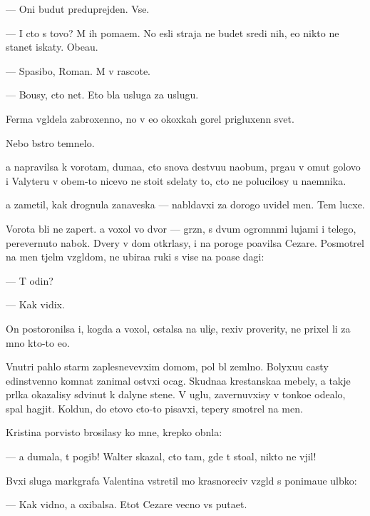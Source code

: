 \documentclass[10pt]{book}
\begin{document}
— Oni budut preduprejden{\yi}. Vse.

— I cto s tovo? M{\yi} ih po{\y}ma{\y}em. No {\y}esli straja ne budet sredi nih, {\y}e{\y}o nikto ne stanet iskaty. Obe{\x}a{\y}u.

— Spasibo, Roman. M{\yi} v rascote.

— Bo{\y}usy, cto net. Eto b{\yi}la usluga za uslugu.



Ferma v{\yi}gl{\ia}dela zabroxenno{\y}, no v {\y}e{\y}o okoxkah gorel prigluxenn{\yi}{\y} svet.

Nebo b{\yi}stro temnelo.

{\Y}a napravilsa k vorotam, duma{\y}a, cto snova de{\y}stvu{\y}u naobum, pr{\yi}ga{\y}u v omut golovo{\y} i Valyteru v ob{\x}em-to nicevo ne sto{\y}it sdelaty to, cto ne polucilosy u na{\y}emnika.

{\Y}a zametil, kak drognula zanaveska — nabl{\iu}davxi{\y} za dorogo{\y} uvidel men{\ia}. Tem lucxe.

Vorota b{\yi}li ne zapert{\yi}. {\Y}a  voxol vo dvor — gr{\ia}zn{\yi}{\y}, s dvum{\ia} ogromn{\yi}mi lujami i telego{\y}, perevernuto{\y} nabok. Dvery v dom otkr{\yi}lasy, i na poroge po{\y}avilsa Cezare. Posmotrel na men{\ia} t{\ia}jel{\yi}m vzgl{\ia}dom, ne ubira{\y}a ruki s vis{\ia}{\x}e{\y} na po{\y}ase dagi:

— T{\yi} odin?

— Kak vidix.

On postoronilsa i, kogda {\y}a  voxol, ostalsa na uli{\c}e, rexiv proverity, ne prixel li za mno{\y} kto-to {\y}e{\x}o.

Vnutri pahlo star{\yi}m zaplesnevevxim domom, pol b{\yi}l zeml{\ia}no{\y}. Bolyxu{\y}u casty {\y}edinstvenno{\y} komnat{\yi} zanimal ost{\yi}vxi{\y} ocag. Skudna{\y}a krest{\y}anska{\y}a mebely, a takje pr{\ia}lka okazalisy sdvinut{\yi} k dalyne{\y} stene. V uglu, zavernuvxisy v tonko{\y}e ode{\y}alo, spal hagjit. Koldun, do etovo cto-to pisavxi{\y}, tepery smotrel na men{\ia}.

Kristina por{\yi}visto brosilasy ko mne, krepko obn{\ia}la:

— {\Y}a dumala, t{\yi} pogib! Walter skazal, cto tam, gde t{\yi} sto{\y}al, nikto ne v{\yi}jil!

B{\yi}vxi{\y} sluga markgrafa Valentina vstretil mo{\y} krasnoreciv{\yi}{\y} vzgl{\ia}d s ponima{\y}u{\x}e{\y} ul{\yi}bko{\y}:

— Kak vidno, {\y}a oxibalsa. Etot Cezare vecno vs{\e} puta{\y}et.
\end{document}
